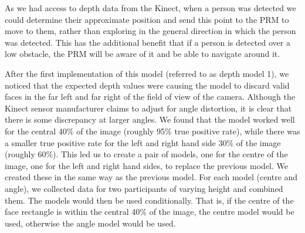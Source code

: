 \documentclass[conference]{IEEEtran}
\begin{document}
As we had access to depth data from the Kinect, when a person was detected we could determine their approximate position and send this point to the PRM to move to them, rather than exploring in the general direction in which the person was detected. This has the additional benefit that if a person is detected over a low obstacle, the PRM will be aware of it and be able to navigate around it.

After the first implementation of this model (referred to as depth model 1), we noticed that the expected depth values were causing the model to discard valid faces in the far left and far right of the field of view of the camera. Although the Kinect sensor manufacturer claims to adjust for angle distortion, it is clear that there is some discrepancy at larger angles. We found that the model worked well for the central 40\% of the image (roughly 95\% true positive rate), while there was a smaller true positive rate for the left and right hand side 30\% of the image (roughly 60\%). This led us to create a pair of models, one for the centre of the image, one for the left and right hand sides, to replace the previous model. We created these in the same way as the previous model. For each model (centre and angle), we collected data for two participants of varying height and combined them. The models would then be used conditionally. That is, if the centre of the face rectangle is within the central 40\% of the image, the centre model would be used, otherwise the angle model would be used.
\end{document}

